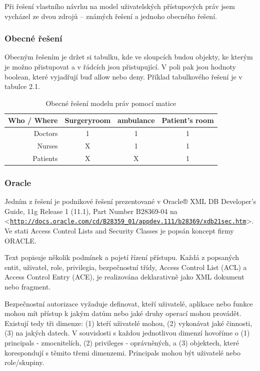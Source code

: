 \documentclass[11pt,twoside,a4paper]{book}
\let\oldUrl\url
\renewcommand\url[1]{<\texttt{\oldUrl{#1}}>}
\begin{document}
Při řešení vlastního návrhu na model uživatelských přístupových práv jsem vycházel ze dvou zdrojů – známých řešení a jednoho obecného řešení.

\subsubsection{Obecné řešení}
Obecným řešením je držet si tabulku, kde ve sloupcích budou objekty, ke kterým je možno přistupovat a v řádcích jsou přistupující. V poli pak jsou hodnoty boolean, které vyjadřují buď allow nebo deny. Příklad tabulkového řešení je v tabulce 2.1.

\begin{table}%
\centering
\begin{tabular}{|r||c|c|c|}
\hline
Who / Where & Surgeryroom & ambulance & Patient's room\\
\hline\hline
Doctors & 1 & 1 & 1\\
\hline
Nurses & X & 1 & 1\\
\hline
Patients & X & X & 1\\
\hline
\end{tabular}
\caption{Obecné řešení modelu práv pomocí matice}
\end{table}


\subsubsection{Oracle}
Jedním z řešení je podnikové řešení prezentované v Oracle® XML DB Developer's Guide, 11g Release 1 (11.1), Part Number B28369-04 na \url{http://docs.oracle.com/cd/B28359_01/appdev.111/b28369/xdb21sec.htm}. Ve stati Access Control Lists and Security Classes je popsán koncept firmy ORACLE.
 
Text popisuje několik podmínek a pojetí řízení přístupu. Každá z popsaných entit, uživatel, role, privilegia, bezpečnostní třídy, Access Control List (ACL) a Access Control Entry (ACE), je realizována deklarativně jako XML dokument nebo fragment.  

Bezpečnostní autorizace vyžaduje definovat, kteří uživatelé, aplikace nebo funkce mohou mít přístup k jakým datům nebo jaké druhy operací mohou provádět. Existují tedy tři dimenze: (1) kteří uživatelé mohou, (2) vykonávat jaké činnosti, (3) na jakých datech. V souvislosti s každou jednotlivou dimenzí hovoříme o (1) principals - zmocnitelích, (2) privileges - oprávněných, a (3) objektech, které korespondují s těmito třemi dimenzemi. Principals mohou být uživatelé nebo role/skupiny.
\end{document}

